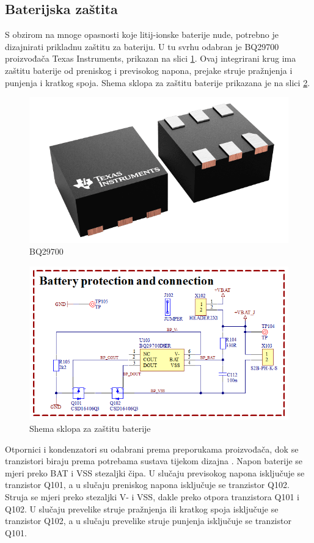 \subsection{Baterijska zaštita}
S obzirom na mnoge opasnosti koje litij-ionske baterije nude, potrebno je dizajnirati prikladnu zaštitu za bateriju. U tu svrhu odabran je BQ29700 proizvođača Texas Instruments, prikazan na slici \ref{slk:BQ29700}. Ovaj integrirani krug ima zaštitu baterije od preniskog i previsokog napona, prejake struje pražnjenja i punjenja i kratkog spoja. Shema sklopa za zaštitu baterije prikazana je na slici \ref{slk:MB_BATPROT}.
\begin{figure}[hbt]
    \centering
    \includegraphics[width=10 cm]{Figures/BQ29700.png}
    \caption{BQ29700}
    \label{slk:BQ29700}
\end{figure}
\begin{figure}[hbt]
    \centering
    \includegraphics[width=10 cm]{Figures/MB_BATPROT.png}
    \caption{Shema sklopa za zaštitu baterije}
    \label{slk:MB_BATPROT}
\end{figure}
Otpornici i kondenzatori su odabrani prema preporukama proizvođača, dok se tranzistori biraju prema potrebama sustava tijekom dizajna \cite{ti:bq29700}. Napon baterije se mjeri preko BAT i VSS stezaljki čipa. U slučaju previsokog napona isključuje se tranzistor Q101, a u slučaju preniskog napona isključuje se tranzistor Q102. Struja se mjeri preko stezaljki V- i VSS, dakle preko otpora tranzistora Q101 i Q102. U slučaju prevelike struje pražnjenja ili kratkog spoja isključuje se tranzistor Q102, a u slučaju prevelike struje punjenja isključuje se tranzistor Q101.

